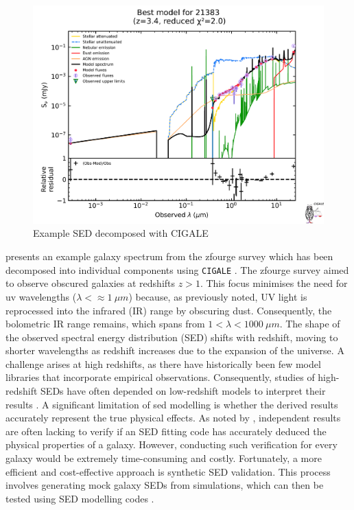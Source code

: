 \begin{figure}
    \centering
    \includegraphics[width=\linewidth]{Figures/SED_Example.png}
    \caption{Example SED decomposed with CIGALE}
    \label{fig: SED}
\end{figure}

 presents an example galaxy spectrum from the \gls{zfourge} survey \citep{straatman_fourstar_2016} which has been decomposed into individual components using \texttt{CIGALE} \citep{boquien_cigale_2019}. The \gls{zfourge} survey aimed to observe obscured galaxies at redshifts $z>1$. This focus minimises the need for \gls{uv} wavelengths ($\lambda < \approx 1 \ \mu m$) because, as previously noted, UV light is reprocessed into the infrared (IR) range by obscuring dust. Consequently, the bolometric IR range remains, which spans from $1 < \lambda < 1000 \ \mu m$. The shape of the observed spectral energy distribution (SED) shifts with redshift, moving to shorter wavelengths as redshift increases due to the expansion of the universe. A challenge arises at high redshifts, as there have historically been few model libraries that incorporate empirical observations. Consequently, studies of high-redshift SEDs have often depended on low-redshift models to interpret their results \citep{conroy_modeling_2013, steinhardt_templates_2023}. A significant limitation of \gls{sed} modelling is whether the derived results accurately represent the true physical effects. As noted by \cite{hayward_should_2015}, independent results are often lacking to verify if an SED fitting code has accurately deduced the physical properties of a galaxy. However, conducting such verification for every galaxy would be extremely time-consuming and costly. Fortunately, a more efficient and cost-effective approach is synthetic SED validation. This process involves generating mock galaxy SEDs from simulations, which can then be tested using SED modelling codes \citep{walcher_fitting_2011, conroy_modeling_2013, hayward_should_2015, coelho_use_2020}.

